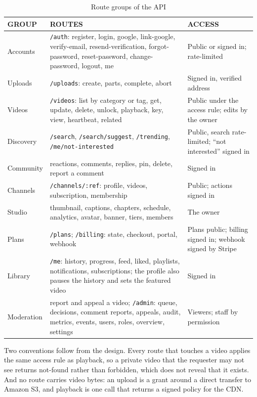 \begin{table}[htbp]
\centering
\caption{Route groups of the API}
\label{tab:api-routes}
\footnotesize
\begin{tabularx}{\textwidth}{>{\raggedright\arraybackslash}p{} >{\raggedright\arraybackslash}X >{\raggedright\arraybackslash}p{}}
\toprule
\textbf{GROUP} & \textbf{ROUTES} & \textbf{ACCESS} \\
\midrule
Accounts & \mbox{\texttt{/auth}}: register, login, google, link-google, verify-email, resend-verification, forgot-password, reset-password, change-password, logout, me & Public or signed in; rate-limited \\
Uploads & \mbox{\texttt{/uploads}}: create, parts, complete, abort & Signed in, verified address \\
Videos & \mbox{\texttt{/videos}}: list by category or tag, get, update, delete, unlock, playback, key, view, heartbeat, related & Public under the access rule; edits by the owner \\
Discovery & \mbox{\texttt{/search}}, \mbox{\texttt{/search/suggest}}, \mbox{\texttt{/trending}}, \mbox{\texttt{/me/not-interested}} & Public, search rate-limited; ``not interested'' signed in \\
Community & reactions, comments, replies, pin, delete, report a comment & Signed in \\
Channels & \mbox{\texttt{/channels/:ref}}: profile, videos, subscription, membership & Public; actions signed in \\
Studio & thumbnail, captions, chapters, schedule, analytics, avatar, banner, tiers, members & The owner \\
Plans & \mbox{\texttt{/plans}}; \mbox{\texttt{/billing}}: state, checkout, portal, webhook & Plans public; billing signed in; webhook signed by Stripe \\
Library & \mbox{\texttt{/me}}: history, progress, feed, liked, playlists, notifications, subscriptions; the profile also pauses the history and sets the featured video & Signed in \\
Moderation & report and appeal a video; \mbox{\texttt{/admin}}: queue, decisions, comment reports, appeals, audit, metrics, events, users, roles, overview, settings & Viewers; staff by permission \\
\bottomrule
\end{tabularx}
\end{table}

Two conventions follow from the design. Every route that touches a video applies the same access
rule as playback, so a private video that the requester may not see returns not-found rather than
forbidden, which does not reveal that it exists. And no route carries video bytes: an upload is a
grant around a direct transfer to Amazon S3, and playback is one call that returns a signed policy
for the CDN.


